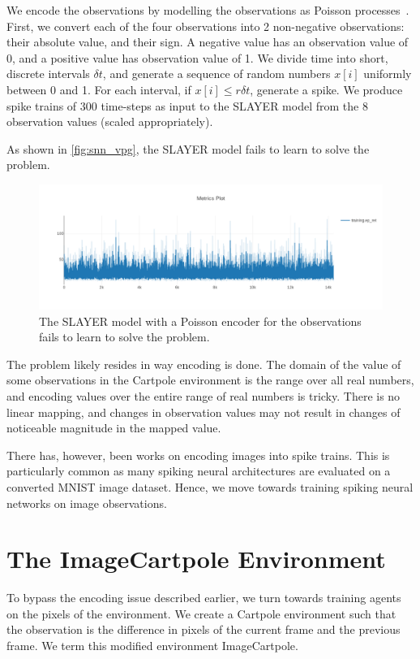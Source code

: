 \documentclass[fyp]{socreport}
\begin{document}
We encode the observations by modelling the observations as Poisson
processes~\cite{heeger2000poisson}. First, we convert each of the four
observations into 2 non-negative observations: their absolute value, and their
sign. A negative value has an observation value of 0, and a positive value has
observation value of 1. We divide time into short, discrete intervals
\(\delta t\), and generate a sequence of random numbers \(x[i]\) uniformly
between 0 and 1. For each interval, if \(x[i] \le r \delta t\), generate a
spike. We produce spike trains of 300 time-steps as input to the SLAYER model
from the 8 observation values (scaled appropriately).

As shown in \autoref{fig:snn_vpg}, the SLAYER model fails to learn to solve the
problem.

\begin{figure}[htbp] \centering
\includegraphics[width=.9\linewidth]{images/slayer_poisson.png}
\caption{\label{fig:snn_vpg} The SLAYER model with a Poisson encoder for the
observations fails to learn to solve the problem.}
\end{figure}

The problem likely resides in way encoding is done. The domain of the value of
some observations in the Cartpole environment is the range over all real
numbers, and encoding values over the entire range of real numbers is
tricky. There is no linear mapping, and changes in observation values may not
result in changes of noticeable magnitude in the mapped value.

There has, however, been works on encoding images into spike trains.  This is
particularly common as many spiking neural architectures are evaluated on a
converted MNIST image dataset. Hence, we move towards training spiking neural
networks on image observations.

\section{The ImageCartpole Environment}

To bypass the encoding issue described earlier, we turn towards training agents
on the pixels of the environment. We create a Cartpole environment such that the
observation is the difference in pixels of the current frame and the previous
frame. We term this modified environment ImageCartpole.
\end{document}
